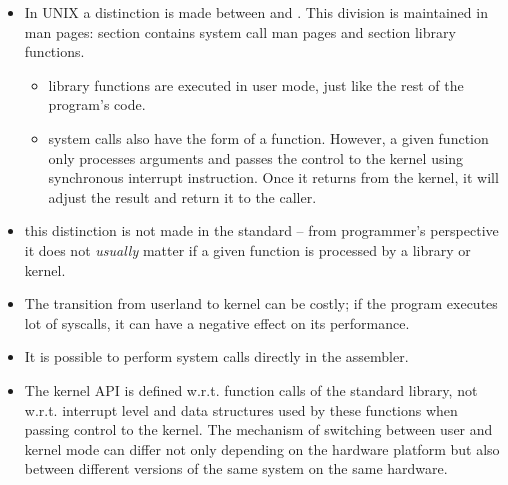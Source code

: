
\begin{slide}
\begin{itemize}
\item In UNIX a distinction is made between  and . This division is maintained in man pages: section  contains
system call man pages and section  library functions.
    \begin{itemize}
    \item library functions are executed in user mode, just like the rest
    of the program's code.
    \item system calls also have the form of a function. However, a given function
    only processes arguments and passes the control to the kernel using
    synchronous interrupt instruction. Once it returns from the kernel,
    it will adjust the result and return it to the caller.
    \end{itemize}
\item this distinction is not made in the standard -- from programmer's
perspective it does not \emph{usually} matter if a given function is processed
by a library or kernel.
\end{itemize}
\end{slide}

\begin{itemize}
\item The transition from userland to kernel can be costly; if the program
executes lot of syscalls, it can have a negative effect on its performance.
\item It is possible to perform system calls directly in the assembler.
\item The kernel API is defined w.r.t. function calls of the standard library,
not w.r.t. interrupt level and data structures used by these functions when
passing control to the kernel. The mechanism of switching between user and
kernel mode can differ not only depending on the hardware platform but also between
different versions of the same system on the same hardware.
\end{itemize}



